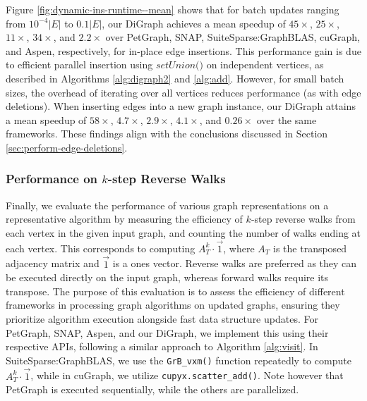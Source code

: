 

Figure \ref{fig:dynamic-ins-runtime--mean} shows that for batch updates ranging from $10^{-4}|E|$ to $0.1|E|$, our DiGraph achieves a mean speedup of $45\times$, $25\times$, $11\times$, $34\times$, and $2.2\times$ over PetGraph, SNAP, SuiteSparse:GraphBLAS, cuGraph, and Aspen, respectively, for in-place edge insertions. This performance gain is due to efficient parallel insertion using $\textit{setUnion()}$ on independent vertices, as described in Algorithms \ref{alg:digraph2} and \ref{alg:add}. However, for small batch sizes, the overhead of iterating over all vertices reduces performance (as with edge deletions). When inserting edges into a new graph instance, our DiGraph attains a mean speedup of $58\times$, $4.7\times$, $2.9\times$, $4.1\times$, and $0.26\times$ over the same frameworks. These findings align with the conclusions discussed in Section \ref{sec:perform-edge-deletions}.


\subsubsection{Performance on $k$-step Reverse Walks}
\label{sec:perform-reverse-walks}

Finally, we evaluate the performance of various graph representations on a representative algorithm by measuring the efficiency of $k$-step reverse walks from each vertex in the given input graph, and counting the number of walks ending at each vertex. This corresponds to computing $A_T^k \cdot \vec{1}$, where $A_T$ is the transposed adjacency matrix and $\vec{1}$ is a ones vector. Reverse walks are preferred as they can be executed directly on the input graph, whereas forward walks require its transpose. The purpose of this evaluation is to assess the efficiency of different frameworks in processing graph algorithms on updated graphs, ensuring they prioritize algorithm execution alongside fast data structure updates. For PetGraph, SNAP, Aspen, and our DiGraph, we implement this using their respective APIs, following a similar approach to Algorithm \ref{alg:visit}. In SuiteSparse:GraphBLAS, we use the \texttt{GrB\_vxm()} function repeatedly to compute $A_T^k \cdot \vec{1}$, while in cuGraph, we utilize \texttt{cupyx.scatter\_add()}. Note however that PetGraph is executed sequentially, while the others are parallelized.



